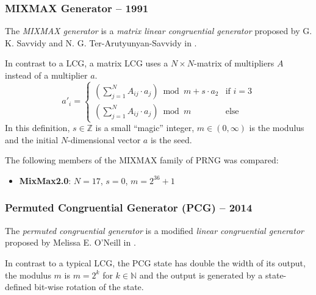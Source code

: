 \subsubsection[MIXMAX Generator -- 1991]{MIXMAX Generator -- 1991} \label{subsubsec:mixmax}

    The \emph{MIXMAX generator} is a \emph{matrix linear congruential generator} proposed by G. K. Savvidy and N. G. Ter-Arutyunyan-Savvidy in \cite{Savvidy:1991}.

    In contrast to a LCG, a matrix LCG uses a $N{\times}N$-matrix of multipliers $A$ instead of a multiplier $a$.
    \begin{equation*}
        a'_i = \begin{cases}
                   \left(\sum_{j = 1}^{N} A_{ij} \cdot a_j\right) \bmod m + s \cdot a_2 & \text{if } i = 3 \\
                   \left(\sum_{j = 1}^{N} A_{ij} \cdot a_j\right) \bmod m               & \text{else}
               \end{cases}
    \end{equation*}
    In this definition, $s \in \mathbb{Z}$ is a small ``magic'' integer, $m \in \left(0, \infty\right)$ is the modulus and the initial $N$-dimensional vector $a$ is the seed.

    The following members of the MIXMAX family of PRNG was compared:
    \begin{itemize}
		\itemsep0em
        \item \textbf{MixMax2.0}: $N = 17$, $s = 0$, $m = 2^{36} + 1$
    \end{itemize}

\subsubsection[Permuted Congruential Generator (PCG) -- 2014]{Permuted Congruential Generator (PCG) -- 2014} \label{subsubsec:pcg}

    The \emph{permuted congruential generator} is a modified \emph{linear congruential generator} proposed by Melissa E. O'Neill in \cite{ONeill:2014}.

    In contrast to a typical LCG, the PCG state has double the width of its output, the modulus $m$ is $m = 2^k$ for $k \in \mathbb{N}$ and the output is generated by a state-defined bit-wise rotation of the state.

